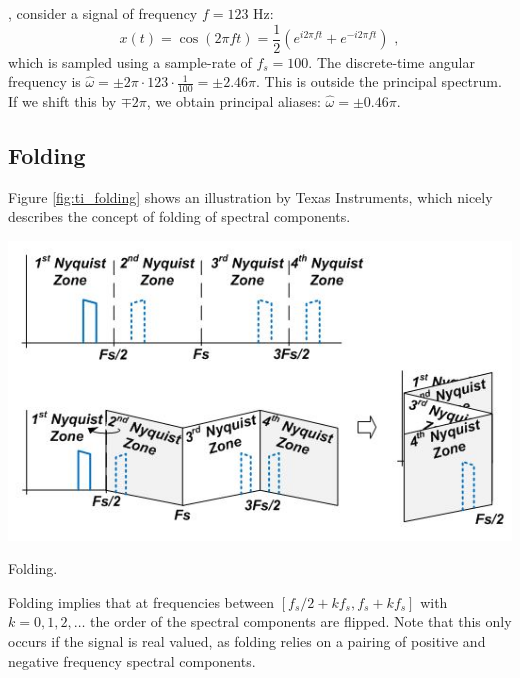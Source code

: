 , consider a signal of frequency $f=123$ Hz:
\begin{equation}
  x(t) =\cos( 2\pi f t) = \frac{1}{2}(e^{i 2\pi f t}+e^{-i 2\pi f t})\,\,,
\end{equation}
which is sampled using a sample-rate of $f_s=100$. The discrete-time angular frequency is $\hat{\omega} = \pm 2\pi \cdot 123 \cdot\frac{1}{100} = \pm 2.46\pi$. This is outside the principal spectrum. If we shift this by $\mp 2\pi$, we obtain principal aliases:
$\hat{\omega} = \pm 0.46 \pi$.

\subsection{Folding}
Figure \ref{fig:ti_folding} shows an illustration by Texas Instruments, which nicely describes the concept of folding of spectral components.

\begin{marginfigure}[-4cm]
\begin{center}
\includegraphics[width=\textwidth]{ch09/figures/folding.JPG}
\end{center}
\caption{Folding.}
\label{fig:ti_folding}
\end{marginfigure}

Folding implies that at frequencies between $[f_s/2+k f_s,f_s + kf_s]$ with $k=0,1,2,\ldots$ the order of the spectral components are flipped. Note that this only occurs if the signal is real valued, as folding relies on a pairing of positive and negative frequency spectral components.

